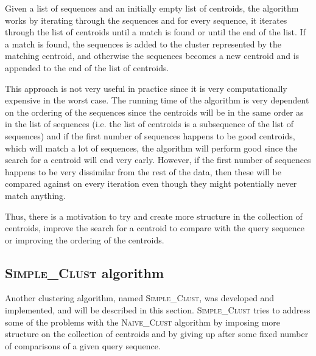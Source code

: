 Given a list of sequences and an initially empty list of centroids, the
algorithm works by iterating through the sequences and for every sequence, it
iterates through the list of centroids until a match is found or until the end
of the list. If a match is found, the sequences is added to the cluster
represented by the matching centroid, and otherwise the sequences becomes a new
centroid and is appended to the end of the list of centroids.



This approach is not very useful in practice since it is very computationally
expensive in the worst case. The running time of the algorithm is very
dependent on the ordering of the sequences since the centroids will be in the
same order as in the list of sequences (i.e. the list of centroids is a
subsequence of the list of sequences) and if the first number of sequences
happens to be good centroids, which will match a lot of sequences, the
algorithm will perform good since the search for a centroid will end very
early. However, if the first number of sequences happens to be very dissimilar
from the rest of the data, then these will be compared against on every
iteration even though they might potentially never match anything.

Thus, there is a motivation to try and create more structure in the collection
of centroids, improve the search for a centroid to compare with the query
sequence or improving the ordering of the centroids.




\subsection{\textsc{Simple\_Clust} algorithm}

Another clustering algorithm, named \textsc{Simple\_Clust}, was developed and
implemented, and will be described in this section. \textsc{Simple\_Clust}
tries to address some of the problems with the \textsc{Naive\_Clust} algorithm
by imposing more structure on the collection of centroids and by giving up
after some fixed number of comparisons of a given query sequence.

